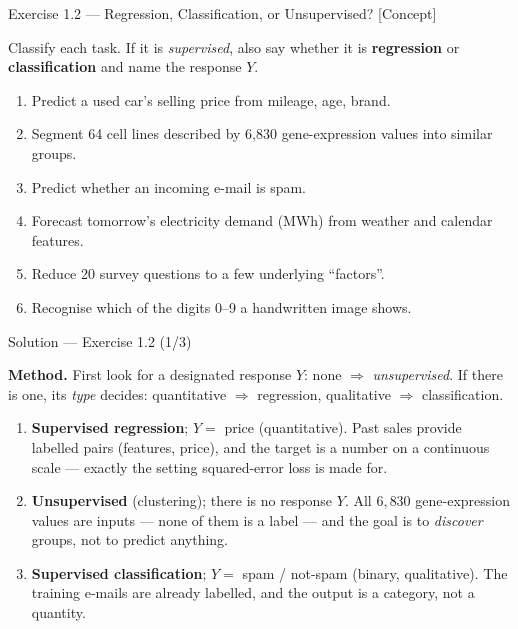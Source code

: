 \documentclass[aspectratio=169,11pt]{beamer}
\begin{document}
\begin{frame}{Exercise 1.2 --- Regression, Classification, or Unsupervised? [Concept]}
\begin{exercise}
Classify each task. If it is \emph{supervised}, also say whether it is
\textbf{regression} or \textbf{classification} and name the response
$Y$.
\begin{enumerate}
  \item Predict a used car's selling price from mileage, age, brand.
  \item Segment 64 cell lines described by 6{,}830 gene-expression
        values into similar groups.
  \item Predict whether an incoming e-mail is spam.
  \item Forecast tomorrow's electricity demand (MWh) from weather and
        calendar features.
  \item Reduce 20 survey questions to a few underlying ``factors''.
  \item Recognise which of the digits 0--9 a handwritten image shows.
\end{enumerate}
\end{exercise}
\end{frame}

\begin{frame}{Solution --- Exercise 1.2 (1/3)}
\begin{solutionbox}
\textbf{Method.} First look for a designated response $Y$: none
$\Rightarrow$ \emph{unsupervised}. If there is one, its \emph{type}
decides: quantitative $\Rightarrow$ regression, qualitative
$\Rightarrow$ classification.
\begin{enumerate}
  \item \textbf{Supervised regression}; $Y=$ price (quantitative).
        Past sales provide labelled pairs (features, price), and the
        target is a number on a continuous scale --- exactly the
        setting squared-error loss is made for.
  \item \textbf{Unsupervised} (clustering); there is no response $Y$.
        All $6{,}830$ gene-expression values are inputs --- none of
        them is a label --- and the goal is to \emph{discover} groups,
        not to predict anything.
  \item \textbf{Supervised classification}; $Y=$ spam / not-spam
        (binary, qualitative). The training e-mails are already
        labelled, and the output is a category, not a quantity.
\end{enumerate}
\end{solutionbox}
\end{frame}
\end{document}
